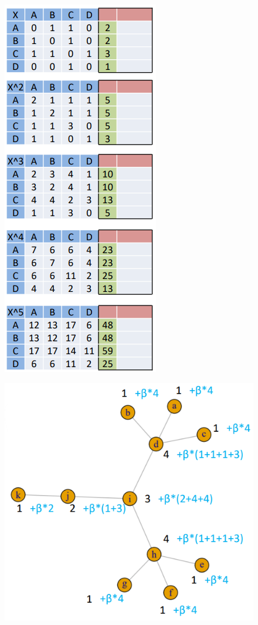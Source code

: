 \documentclass[
  notitlepage,
  onecolumn,
  openany]{book}
\begin{document}
\begin{figure}[h!]

{\centering \includegraphics[width=0.5\linewidth]{images/05-Matrices and Beta centrality/Untitled 4} 

}

\end{figure}

\begin{figure}[h!]

{\centering \includegraphics[width=0.5\linewidth]{images/05-Matrices and Beta centrality/Untitled 5} 

}

\end{figure}
\end{document}
